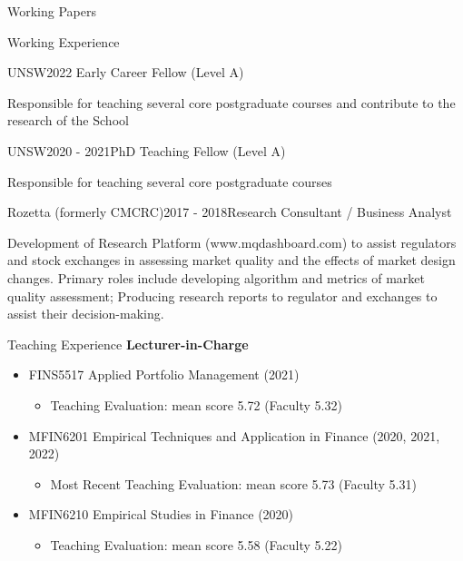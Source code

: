 \documentclass{resume} %
\begin{document}
\begin{rSection}{Working Papers}
	\begin{rSection}{Working Experience}
		\begin{rSubsection}{UNSW}{2022 \- }{Early Career Fellow (Level A)}{}
			\item Responsible for teaching several core postgraduate courses and contribute to the research of the School
		\end{rSubsection}
		\begin{rSubsection}{UNSW}{2020 - 2021}{PhD Teaching Fellow (Level A)}{}
			\item Responsible for teaching several core postgraduate courses
		\end{rSubsection}
		\begin{rSubsection}{Rozetta (formerly CMCRC)}{2017 - 2018}{Research Consultant / Business Analyst}{}
			\item Development of Research Platform (www.mqdashboard.com) to assist regulators and stock exchanges in assessing market quality and the effects of market design changes. Primary roles include developing algorithm and metrics of market quality assessment; Producing research reports to regulator and exchanges to assist their decision-making.
		\end{rSubsection}
	\end{rSection}

\end{rSection}
\begin{rSection}{Teaching Experience}
	\textbf{Lecturer-in-Charge}
	\begin{itemize}
		\item FINS5517 Applied Portfolio Management (2021)
		      \begin{itemize}
			      \item Teaching Evaluation: mean score 5.72 (Faculty 5.32)
		      \end{itemize}
		\item MFIN6201 Empirical Techniques and Application in Finance (2020, 2021, 2022)
		      \begin{itemize}
			      \item Most Recent Teaching Evaluation: mean score 5.73 (Faculty 5.31)
		      \end{itemize}
		\item MFIN6210 Empirical Studies in Finance (2020)
		      \begin{itemize}
			      \item Teaching Evaluation: mean score 5.58 (Faculty 5.22)
		      \end{itemize}
	\end{itemize}
\end{rSection}
\end{document}
